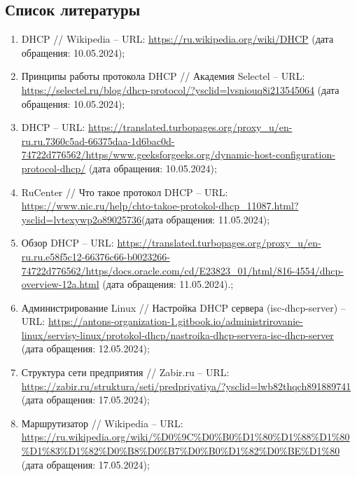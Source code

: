 
\begin{center}
	\section*{Список литературы}
\end{center}

\begin{enumerate}
	\item DHCP // Wikipedia -- URL:  \url{https://ru.wikipedia.org/wiki/DHCP} (дата обращения: 10.05.2024);
	
	\item Принципы работы протокола DHCP // Академия Selectel -- URL: \url{https://selectel.ru/blog/dhcp-protocol/?ysclid=lvsniouq8i213545064} (дата обращения: 10.05.2024);
	
	\item DHCP -- URL: \url{https://translated.turbopages.org/proxy_u/en-ru.ru.7360c5ad-66375daa-1d6bac0d-74722d776562/https/www.geeksforgeeks.org/dynamic-host-configuration-protocol-dhcp/} (дата обращения: 10.05.2024);
	
	\item RuCenter // Что такое протокол DHCP -- URL: \url{https://www.nic.ru/help/chto-takoe-protokol-dhcp_11087.html?ysclid=lvtexywp2o89025736}(дата обращения: 11.05.2024);
	
	\item Обзор DHCP -- URL: \url{https://translated.turbopages.org/proxy_u/en-ru.ru.e58f5c12-66376c66-b0023266-74722d776562/https/docs.oracle.com/cd/E23823_01/html/816-4554/dhcp-overview-12a.html} (дата обращения: 11.05.2024).;
	
	\item Администрирование Linux // Настройка DHCP сервера (isc-dhcp-server) -- URL: \url{https://antons-organization-1.gitbook.io/administrirovanie-linux/servisy-linux/protokol-dhcp/nastroika-dhcp-servera-isc-dhcp-server} (дата обращения: 12.05.2024);
	
	\item  Структура сети предприятия // Zabir.ru -- URL: \url{https://zabir.ru/struktura/seti/predpriyatiya/?ysclid=lwb82thqch891889741} (дата обращения: 17.05.2024);
	
	\item  Маршрутизатор // Wikipedia -- URL: \url{https://ru.wikipedia.org/wiki/%D0%9C%D0%B0%D1%80%D1%88%D1%80%D1%83%D1%82%D0%B8%D0%B7%D0%B0%D1%82%D0%BE%D1%80} (дата обращения: 17.05.2024);
	

\end{enumerate}
